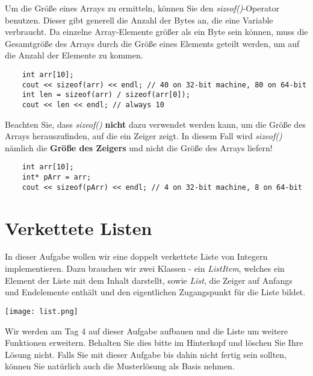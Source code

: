 \documentclass[
  accentcolor=tud1c,	%
  colorbacktitle,		%
  inverttitle,			%
  german,				%
  twoside
]{tudexercise}
\begin{document}
Um die Größe eines Arrays zu ermitteln, können Sie den \emph{sizeof()}-Operator benutzen. Dieser gibt generell die Anzahl der Bytes an, die eine Variable verbraucht. Da einzelne Array-Elemente größer als ein Byte sein können, muss die Gesamtgröße des Arrays durch die Größe eines Elements geteilt werden, um auf die Anzahl der Elemente zu kommen.
\begin{lstlisting}
	int arr[10];
	cout << sizeof(arr) << endl; // 40 on 32-bit machine, 80 on 64-bit
	int len = sizeof(arr) / sizeof(arr[0]); 
	cout << len << endl; // always 10
\end{lstlisting}

Beachten Sie, dass \emph{sizeof()} \textbf{nicht} dazu verwendet werden kann, um die Größe des Arrays herauszufinden, auf die ein Zeiger zeigt. In diesem Fall wird \emph{sizeof()} nämlich die \textbf{Größe des Zeigers} und nicht die Größe des Arrays liefern!
\begin{lstlisting}
	int arr[10];
	int* pArr = arr;
	cout << sizeof(pArr) << endl; // 4 on 32-bit machine, 8 on 64-bit
\end{lstlisting}

\section{Verkettete Listen}
In dieser Aufgabe wollen wir eine doppelt verkettete Liste von Integern implementieren. Dazu brauchen wir zwei Klassen - ein \emph{ListItem}, welches ein Element der Liste mit dem Inhalt darstellt, sowie \emph{List}, die Zeiger auf Anfangs und Endelemente enthält und den eigentlichen Zugangspunkt für die Liste bildet.

\texttt{[image: list.png]}

Wir werden am Tag 4 auf dieser Aufgabe aufbauen und die Liste um weitere Funktionen erweitern. Behalten Sie dies bitte im Hinterkopf und löschen Sie Ihre Lösung nicht. Falls Sie mit dieser Aufgabe bis dahin nicht fertig sein sollten, können Sie natürlich auch die Musterlösung als Basis nehmen.
\end{document}
